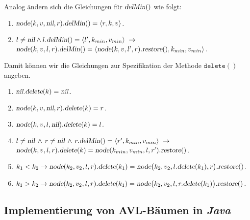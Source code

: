 Analog \"andern sich die Gleichungen f\"ur $\textsl{delMin}()$ wie folgt:
\begin{enumerate}
\item $\textsl{node}(k, v, \textsl{nil}, r)\mathtt{.}\textsl{delMin}() = \langle r, k, v \rangle$.
\item $l\not= \textsl{nil} \wedge l\mathtt{.}\textsl{delMin}() = \langle l',k_{min}, v_{min}\rangle 
       \;\rightarrow$ \\[0.2cm]
       \hspace*{1.3cm} 
       $\textsl{node}(k, v, l, r)\mathtt{.}\textsl{delMin}() = 
        \langle \textsl{node}(k, v, l', r).\textsl{restore}(), k_{min}, v_{min} \rangle$.
\end{enumerate}
Damit k\"onnen wir die Gleichungen zur Spezifikation der  Methode $\mathtt{delete}()$ angeben.
\begin{enumerate}
\item $\textsl{nil}\mathtt{.}\textsl{delete}(k) = \textsl{nil}$.
\item $\textsl{node}(k,v,\textsl{nil},r)\mathtt{.}\textsl{delete}(k) = r$.
\item $\textsl{node}(k,v,l,\textsl{nil})\mathtt{.}\textsl{delete}(k) = l$.
\item $l \not= \textsl{nil} \,\wedge\, r \not= \textsl{nil} \,\wedge\, 
       r\mathtt{.}\textsl{delMin}() = \langle r',k_{min}, v_{min} \rangle  \;\rightarrow$ \\[0.2cm]
      \hspace*{1.3cm}
      $\textsl{node}(k,v,l,r)\mathtt{.}\textsl{delete}(k) = \textsl{node}(k_{min},v_{min},l,r').\textsl{restore}()$.
\item $k_1 < k_2 \rightarrow \textsl{node}(k_2,v_2,l,r)\mathtt{.}\textsl{delete}(k_1) = 
       \textsl{node}\bigl(k_2,v_2,l\mathtt{.}\textsl{delete}(k_1),r\bigr).\textsl{restore}()$.
\item $k_1 > k_2 \rightarrow \textsl{node}(k_2,v_2,l,r)\mathtt{.}\textsl{delete}(k_1) = 
       \textsl{node}\bigl(k_2,v_2,l,r\mathtt{.}\textsl{delete}(k_1)\bigr).\textsl{restore}()$.
\end{enumerate}

\subsection{Implementierung von AVL-B\"aumen in \textsl{Java}}
 
